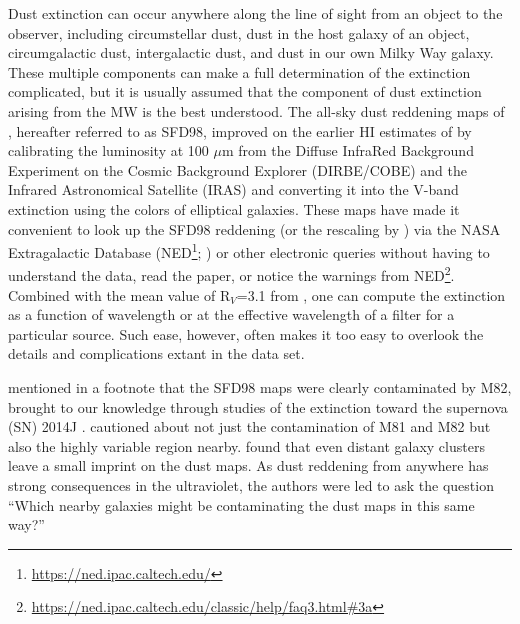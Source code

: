 \documentclass[twocolumn]{aastex63}
\begin{document}
Dust extinction can occur anywhere along the line of sight from an object to the observer, including circumstellar dust, dust in the host galaxy of an object, circumgalactic dust, intergalactic dust, and dust in our own Milky Way galaxy.  These multiple components can make a full determination of the extinction complicated, but it is usually assumed that the component of dust extinction arising from the MW is the best understood.  The all-sky dust reddening maps of \citet{Schlegel_etal_1998}, hereafter referred to as SFD98, improved on the earlier HI estimates of \citet{Burstein_Heiles_1982} by  calibrating the luminosity at 100 $\mu$m from the Diffuse InfraRed Background Experiment on the Cosmic Background Explorer (DIRBE/COBE) and the Infrared Astronomical Satellite (IRAS) and converting it into the V-band extinction using the colors of elliptical galaxies.  These maps have made it convenient to look up the SFD98 reddening (or the rescaling by
\citealp{Schlafly_Finkbeiner_2011}) via the NASA Extragalactic Database (NED\footnote{\url{https://ned.ipac.caltech.edu/}}; \citealp{Mazzarella_etal_2001}) 
or other electronic queries without having to understand the data,  read the paper, or notice the warnings from NED\footnote{\url{https://ned.ipac.caltech.edu/classic/help/faq3.html\#3a}}.  Combined with the mean value of R$_V$=3.1 from \citet{Fitzpatrick_1999}, one can compute the extinction as a function of wavelength or at the effective wavelength of a filter for a particular source.
Such ease, however, often makes it too easy to overlook the details and complications extant in the data set.

 \citet{Dalcanton_etal_2009} mentioned in a footnote that the SFD98 maps were clearly contaminated by M82, brought to our knowledge through studies of the extinction toward the supernova (SN) 2014J \citep{Foley_etal_2014J}.  \citet{Johnson_etal_2009} cautioned about not just the contamination of M81 and M82 but also the highly variable region nearby.  \citet{Chiang_Menard_2019} found that even distant galaxy clusters leave a small imprint on the dust maps. As dust reddening from anywhere has strong consequences in the ultraviolet, the authors were led to ask the question ``Which nearby galaxies might be contaminating the dust maps in this same way?''
\end{document}
